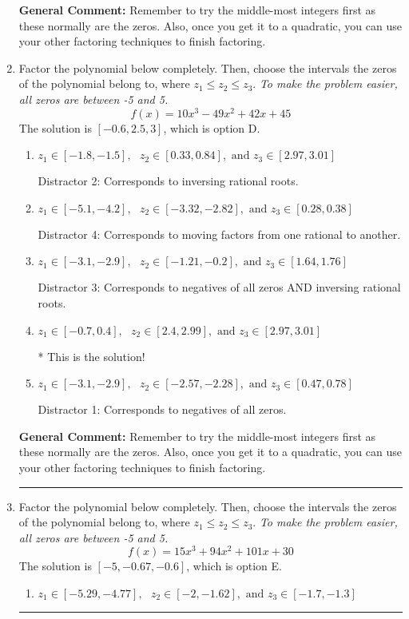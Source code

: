 \documentclass{extbook}[14pt]
\newcommand{\litem}[1]{\item #1

\rule{\textwidth}{0.4pt}}
\begin{document}
\begin{enumerate}
{\textbf{General Comment:} Remember to try the middle-most integers first as these normally are the zeros. Also, once you get it to a quadratic, you can use your other factoring techniques to finish factoring.
}
\litem{
Factor the polynomial below completely. Then, choose the intervals the zeros of the polynomial belong to, where $z_1 \leq z_2 \leq z_3$. \textit{To make the problem easier, all zeros are between -5 and 5.}
\[ f(x) = 10x^{3} -49 x^{2} +42 x + 45 \]The solution is \( [-0.6, 2.5, 3] \), which is option D.\begin{enumerate}[label=\Alph*.]
\item \( z_1 \in [-1.8, -1.5], \text{   }  z_2 \in [0.33, 0.84], \text{   and   } z_3 \in [2.97, 3.01] \)

 Distractor 2: Corresponds to inversing rational roots.
\item \( z_1 \in [-5.1, -4.2], \text{   }  z_2 \in [-3.32, -2.82], \text{   and   } z_3 \in [0.28, 0.38] \)

 Distractor 4: Corresponds to moving factors from one rational to another.
\item \( z_1 \in [-3.1, -2.9], \text{   }  z_2 \in [-1.21, -0.2], \text{   and   } z_3 \in [1.64, 1.76] \)

 Distractor 3: Corresponds to negatives of all zeros AND inversing rational roots.
\item \( z_1 \in [-0.7, 0.4], \text{   }  z_2 \in [2.4, 2.99], \text{   and   } z_3 \in [2.97, 3.01] \)

* This is the solution!
\item \( z_1 \in [-3.1, -2.9], \text{   }  z_2 \in [-2.57, -2.28], \text{   and   } z_3 \in [0.47, 0.78] \)

 Distractor 1: Corresponds to negatives of all zeros.
\end{enumerate}

\textbf{General Comment:} Remember to try the middle-most integers first as these normally are the zeros. Also, once you get it to a quadratic, you can use your other factoring techniques to finish factoring.
}
\litem{
Factor the polynomial below completely. Then, choose the intervals the zeros of the polynomial belong to, where $z_1 \leq z_2 \leq z_3$. \textit{To make the problem easier, all zeros are between -5 and 5.}
\[ f(x) = 15x^{3} +94 x^{2} +101 x + 30 \]The solution is \( [-5, -0.67, -0.6] \), which is option E.\begin{enumerate}[label=\Alph*.]
\item \( z_1 \in [-5.29, -4.77], \text{   }  z_2 \in [-2, -1.62], \text{   and   } z_3 \in [-1.7, -1.3] \)


\end{enumerate}}
\end{enumerate}
\end{document}
